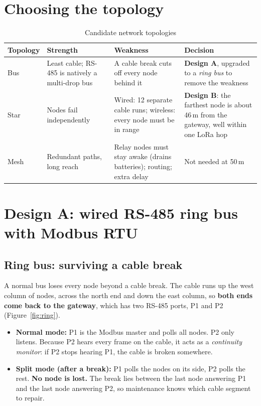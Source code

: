\documentclass[11pt,a4paper]{report}
\begin{document}
\section{Choosing the topology}
\begin{table}[htbp]
\centering
\caption{Candidate network topologies}\label{tab:topo}
\small
\begin{tabularx}{\textwidth}{>{\raggedright\arraybackslash}p{1.9cm} Y Y Y}
\toprule
\textbf{Topology} & \textbf{Strength} & \textbf{Weakness} & \textbf{Decision}\\
\midrule
Bus & Least cable; RS-485 is natively a multi-drop bus & A cable break cuts off every node behind it & \textbf{Design A}, upgraded to a \emph{ring bus} to remove the weakness\\
Star & Nodes fail independently & Wired: 12 separate cable runs; wireless: every node must be in range & \textbf{Design B}: the farthest node is about 46\,m from the gateway, well within one LoRa hop\\
Mesh & Redundant paths, long reach & Relay nodes must stay awake (drains batteries); routing; extra delay & Not needed at 50\,m\\
\bottomrule
\end{tabularx}
\end{table}

\section{Design A: wired RS-485 ring bus with Modbus RTU}
\subsection{Ring bus: surviving a cable break}
A normal bus loses every node beyond a cable break. The cable runs up the west column of nodes, across the north end and down the east column, so \textbf{both ends come back to the gateway}, which has two RS-485 ports, P1 and P2 (Figure~\ref{fig:ring}).
\begin{itemize}
  \item \textbf{Normal mode:} P1 is the Modbus master and polls all nodes. P2 only listens. Because P2 hears every frame on the cable, it acts as a \emph{continuity monitor}: if P2 stops hearing P1, the cable is broken somewhere.
  \item \textbf{Split mode (after a break):} P1 polls the nodes on its side, P2 polls the rest. \textbf{No node is lost.} The break lies between the last node answering P1 and the last node answering P2, so maintenance knows which cable segment to repair.
\end{itemize}
\end{document}
